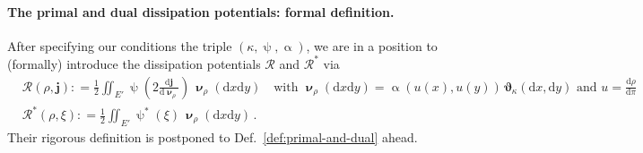 \documentclass[11pt,reqno]{amsart}
\numberwithin{equation}{section}
\newcommand{\R}{\mathbb{R}}
\newcommand{\calM}{\mathcal{M}}
\newcommand{\calR}{\mathcal{R}}
\newcommand{\dd}{\mathrm{d}}
\theoremstyle{definition}
\newtheorem{remark}[theorem]{Remark}
\def\dd{\mathrm{d}}
\newcommand{\Cc}{\mathrm{C}_{\mathrm{c}}}
\newcommand{\teta}{\boldsymbol \vartheta}
\newcommand{\tetapi}{\boldsymbol{\teta}_{\kappa}}
\def\calR{\mathscr R}
\newcommand{\bnu}{\boldsymbol\upnu}
\newcommand{\scrR}{\mathscr{R}}
\newcommand{\jj}{{\boldsymbol{j}}}
\newcommand{\Ed}{{E'}}
\newcommand{\Mloc}{\mathcal{M}_{\mathrm{loc}}}
\newcommand{\psih}{\mathfrak{f}}%
\newcommand{\RNEW}{\color{black}} %
\newcommand{\TODO}[1]{\todo[inline, color=cyan!20]{#1}}
\newcommand{\EEE}{\color{black}}
\numberwithin{equation}{section}
\begin{document}

%
\paragraph{\bf The primal and dual dissipation potentials: formal definition.}
\RNEW After specifying our conditions  the  triple $(\kappa, \uppsi, \upalpha)$, we are in a position to 
 (formally) introduce  the dissipation potentials $\scrR$ and 
$\scrR^*$ via 
\begin{equation}
\label{formal_definition}
\begin{aligned}
&
\scrR(\rho,\jj): = \frac12 \iint_{E'} \uppsi \left( 2 \frac{\dd \jj}{\dd \bnu_\rho} \right) \, \bnu_\rho(\dd x \dd y) \quad\text{with } \bnu_\rho(\dd x \dd y) =\upalpha(u(x),u(y)) \, \tetapi (\dd x, \dd y ) \text{ and } u = \frac{\dd \rho}{\dd \pi}
\\
&
\scrR^*(\rho,\xi): = \frac12 \iint_{E'} \uppsi^*(\xi)  \,\bnu_\rho(\dd x \dd y)\,.
\end{aligned}
\end{equation}
Their rigorous definition is postponed to Def.\ \ref{def:primal-and-dual} ahead. \EEE

\end{document}
